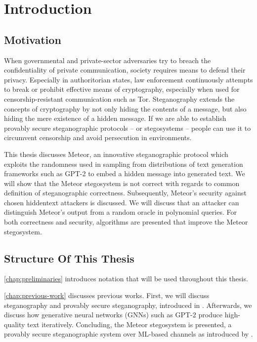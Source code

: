 \chapter{Introduction}

\section{Motivation}

When governmental and private-sector adversaries try to breach the confidentiality of private communication, society requires means to defend their privacy.
Especially in authoritorian states, law enforcement continuously attempts to break or prohibit effective means of cryptography, especially when used for censorship-resistant communication such as Tor.
Steganography extends the concepts of cryptography by not only hiding the contents of a message, but also hiding the mere existence of a hidden message.
If we are able to establish provably secure steganographic protocols -- or stegosystems -- people can use it to circumvent censorship and avoid persecution in environments.

This thesis discusses Meteor, an innovative steganographic protocol which exploits the randomness used in sampling from distributions of text generation frameworks such as GPT-2 to embed a hidden message into generated text.
We will show that the Meteor stegosystem is not correct with regards to common definition of steganographic correctness.
Subsequently, Meteor's security against chosen hiddentext attackers is discussed.
We will discuss that an attacker can distinguish Meteor's output from a random oracle in polynomial queries.
For both correctness and security, algorithms are presented that improve the Meteor stegosystem.



\section{Structure Of This Thesis}

\autoref{chap:preliminaries} introduces notation that will be used throughout this thesis.

\autoref{chap:previous-work} discusses previous works.
First, we will discuss steganography and provably secure steganography, introduced in \cite{Hopper2004}.
Afterwards, we discuss how generative neural networks (GNNs) such as GPT-2 produce high-quality text iteratively.
Concluding, the Meteor stegosystem is presented, a provably secure steganographic system over ML-based channels as introduced by \cite{Meteor2021}.

